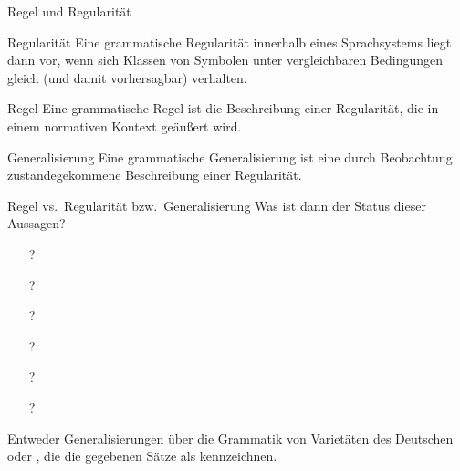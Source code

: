 \begin{frame}
  {Regel und Regularität}
  \onslide<+->
  \onslide<+->
  \begin{block}{Regularität}
    Eine grammatische Regularität innerhalb eines Sprachsystems liegt dann vor, wenn sich Klassen von Symbolen unter vergleichbaren Bedingungen gleich (und damit vorhersagbar) verhalten.
  \end{block}

  \onslide<+->
  \Halbzeile

  \begin{block}{Regel}
    Eine grammatische Regel ist die Beschreibung einer Regularität, die in einem normativen Kontext geäußert wird.
  \end{block}

  \onslide<+->
  \Halbzeile
  
  \begin{block}{Generalisierung}
    Eine grammatische Generalisierung ist eine durch Beobachtung zustandegekommene Beschreibung einer Regularität.
  \end{block}
\end{frame}

\begin{frame}
  {Regel vs.\ Regularität bzw.\ Generalisierung}
  \onslide<+->
  \onslide<+->
  Was ist dann der Status dieser Aussagen?\\
  \Zeile 
  \onslide<+->
  \begin{itemize}
    \item[?] 
    \item[?] 
    \item[?] 
    \item[?] 
    \item[?] 
    \item[?] 
  \end{itemize}
  \Zeile
  \onslide<+->
   Entweder \alert{Generalisierungen} über die Grammatik von \alert{Varietäten des Deutschen} \\
  oder , die die gegebenen Sätze als  kennzeichnen.
\end{frame}

